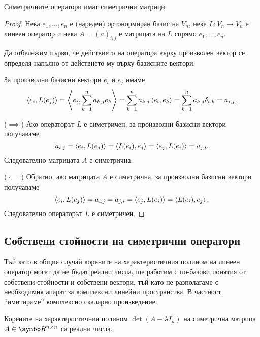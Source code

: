 \documentclass[numbers=endperiod, bibliography=totocnumbered]{scrartcl}
\begin{document}
\begin{theorem}
  Симетричните оператори имат симетрични матрици.
\end{theorem}
\begin{proof}
  Нека \( e_1, \ldots, e_n \) е (нареден) ортонормиран базис на \( V_n \), нека \( L: V_n \to V_n \) е линеен оператор и нека \( A = {(a)}_{i,j} \) е матрицата на \( L \) спрямо \( e_1, \ldots, e_n \).

  Да отбележим първо, че действието на оператора върху произволен вектор се определя напълно от действието му върху базисните вектори.

  За произволни базисни вектори \( e_i \) и \( e_j \) имаме
  \begin{equation*}
    \left\langle e_i, L(e_j) \right\rangle
    =
    \left\langle e_i, \sum_{k=1}^n a_{k,j} e_k \right\rangle
    =
    \sum_{k=1}^n a_{k,j} \left\langle e_i, e_k \right\rangle
    =
    \sum_{k=1}^n a_{k,j} \delta_{i,k}
    =
    a_{i,j}.
  \end{equation*}

  (\( \implies \)) Ако операторът \( L \) е симетричен, за произволни базисни вектори получаваме
  \begin{equation*}
    a_{i,j}
    =
    \left\langle e_i, L(e_j) \right\rangle
    =
    \left\langle L(e_i), e_j \right\rangle
    =
    \left\langle e_j, L(e_i) \right\rangle
    =
    a_{j,i}.
  \end{equation*}
  Следователно матрицата \( A \) е симетрична.

  (\( \impliedby \)) Обратно, ако матрицата \( A \) е симетрична, за произволни базисни вектори получаваме
  \begin{equation*}
    \left\langle e_i, L(e_j) \right\rangle
    =
    a_{i,j}
    =
    a_{j,i}
    =
    \left\langle e_j, L(e_i) \right\rangle
    =
    \left\langle L(e_i), e_j \right\rangle.
  \end{equation*}
  Следователно операторът \( L \) е симетричен.
\end{proof}

\subsection{Собствени стойности на симетрични оператори}

Тъй като в общия случай корените на характеристичния полином на линеен оператор могат да не бъдат реални числа, ще работим с по-базови понятия от собствени стойности и собствени вектори, тъй като не разполагаме с необходимия апарат за комплексни линейни пространства. В частност, \enquote{имитираме} комплексно скаларно произведение.

\begin{theorem}
  Корените на характеристичния полином \( \det(A - \lambda I_n) \) на симетрична матрица \( A \in \R^{n \times n} \) са реални числа.
\end{theorem}
\end{document}
